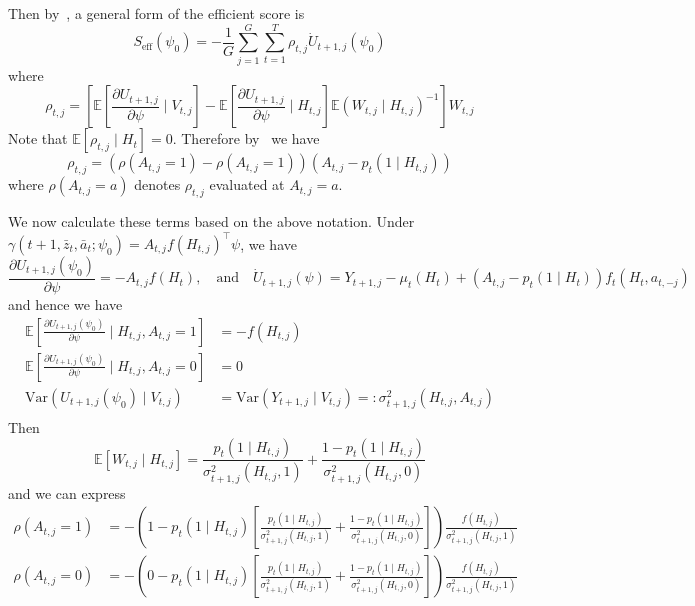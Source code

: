 \documentclass[12pt]{article}
\begin{document}
Then by~\cite[Lemma I.8]{Qian2021}, a general form of the efficient score is
$$
S_{\text{eff}} (\psi_0) = - \frac{1}{G} \sum_{j=1}^G \sum_{t=1}^T \rho_{t,j} \dot{U}_{t+1,j} (\psi_0)
$$
where
$$
\rho_{t,j} = \left[ \mathbb{E} \left[ \frac{\partial U_{t+1,j}}{\partial \psi} \mid V_{t,j} \right] - \mathbb{E} \left[ \frac{\partial U_{t+1,j}}{\partial \psi} \mid H_{t,j} \right] \mathbb{E} \left( W_{t,j} \mid H_{t,j} \right)^{-1} \right] W_{t,j}
$$
Note that $\mathbb{E} \left[ \rho_{t,j} \mid H_t \right] = 0$.  Therefore by~\cite[Lemma I.1]{Qian2021} we have
$$
\rho_{t,j} = \left( \rho(A_{t,j} = 1) - \rho(A_{t,j} = 1) \right) (A_{t,j} - p_t (1 \mid H_{t,j}))
$$
where  $\rho(A_{t,j} = a)$ denotes $\rho_{t,j}$ evaluated at $A_{t,j} = a$.

We now calculate these terms based on the above notation. Under $\gamma(t+1, \bar z_t, \bar a_t; \psi_0) = A_{t,j} f(H_{t,j})^\top \psi$, we have
$$
\frac{\partial U_{t+1,j} (\psi_0)}{\partial \psi} = - A_{t,j} f(H_t), \quad \text{and} \quad
\dot{U}_{t+1,j} (\psi) = Y_{t+1,j} - \mu_t (H_t) + (A_{t,j}-p_t(1 \mid H_t)) f_t(H_t, a_{t,-j})
$$
and hence we have
\begin{align*}
\mathbb{E} \left[ \frac{\partial U_{t+1,j} (\psi_0)}{\partial \psi} \mid H_{t,j}, A_{t,j} = 1 \right] &= - f(H_{t,j}) \\
\mathbb{E} \left[ \frac{\partial U_{t+1,j} (\psi_0)}{\partial \psi} \mid H_{t,j}, A_{t,j} = 0 \right] &= 0 \\
\text{Var} \left( U_{t+1,j} (\psi_0) \mid V_{t,j} \right) &=
\text{Var} \left( Y_{t+1,j} \mid V_{t,j} \right) =: \sigma^2_{t+1,j} (H_{t,j}, A_{t,j}) \\
\end{align*}
Then
$$
\mathbb{E} \left[ W_{t,j} \mid H_{t,j} \right] = \frac{p_t (1 \mid H_{t,j} )}{\sigma^2_{t+1,j} (H_{t,j}, 1)} + \frac{1-p_t (1 \mid H_{t,j} )}{\sigma^2_{t+1,j} (H_{t,j}, 0)}
$$
and we can express
\begin{align*}
\rho(A_{t,j} = 1) &= - \left( 1 -p_t ( 1 \mid H_{t,j}) \left[  \frac{p_t (1 \mid H_{t,j} )}{\sigma^2_{t+1,j} (H_{t,j}, 1)} + \frac{1-p_t (1 \mid H_{t,j} )}{\sigma^2_{t+1,j} (H_{t,j}, 0)} \right] \right) \frac{f(H_{t,j})}{\sigma^2_{t+1,j} (H_{t,j}, 1)} \\
\rho(A_{t,j} = 0) &= - \left( 0 -p_t ( 1 \mid H_{t,j}) \left[  \frac{p_t (1 \mid H_{t,j} )}{\sigma^2_{t+1,j} (H_{t,j}, 1)} + \frac{1-p_t (1 \mid H_{t,j} )}{\sigma^2_{t+1,j} (H_{t,j}, 0)} \right] \right) \frac{f(H_{t,j})}{\sigma^2_{t+1,j} (H_{t,j}, 1)}
\end{align*}
\end{document}
